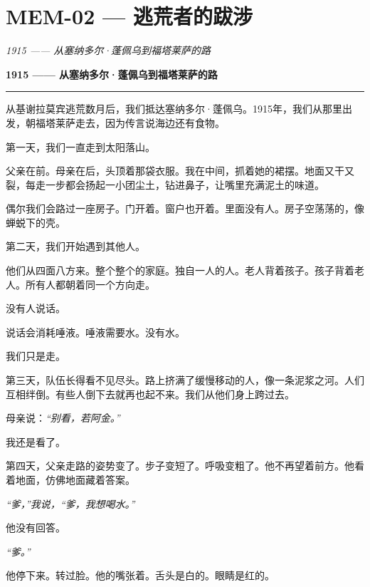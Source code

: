\section*{\textbf{MEM-02} --- 逃荒者的跋涉}

\noindent \textit{1915 —— 从塞纳多尔·蓬佩乌到福塔莱萨的路}

\noindent \textbf{1915 —— 从塞纳多尔·蓬佩乌到福塔莱萨的路}

\vspace{0.5em}\noindent\rule{\textwidth}{0.5pt}\vspace{0.5em}

\noindent 从基谢拉莫宾逃荒数月后，我们抵达塞纳多尔·蓬佩乌。1915年，我们从那里出发，朝福塔莱萨走去，因为传言说海边还有食物。

\noindent 第一天，我们一直走到太阳落山。

\noindent 父亲在前。母亲在后，头顶着那袋衣服。我在中间，抓着她的裙摆。地面又干又裂，每走一步都会扬起一小团尘土，钻进鼻子，让嘴里充满泥土的味道。

\noindent 偶尔我们会路过一座房子。门开着。窗户也开着。里面没有人。房子空荡荡的，像蝉蜕下的壳。

\noindent 第二天，我们开始遇到其他人。

\noindent 他们从四面八方来。整个整个的家庭。独自一人的人。老人背着孩子。孩子背着老人。所有人都朝着同一个方向走。

\noindent 没有人说话。

\noindent 说话会消耗唾液。唾液需要水。没有水。

\noindent 我们只是走。

\noindent 第三天，队伍长得看不见尽头。路上挤满了缓慢移动的人，像一条泥浆之河。人们互相绊倒。有些人倒下去就再也起不来。我们从他们身上跨过去。

\noindent 母亲说：\textit{“别看，若阿金。”}

\noindent 我还是看了。

\noindent 第四天，父亲走路的姿势变了。步子变短了。呼吸变粗了。他不再望着前方。他看着地面，仿佛地面藏着答案。

\noindent \textit{“爹，”我说，“爹，我想喝水。”}

\noindent 他没有回答。

\noindent \textit{“爹。”}

\noindent 他停下来。转过脸。他的嘴张着。舌头是白的。眼睛是红的。

